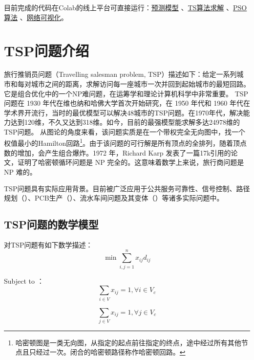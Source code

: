 \documentclass[lang=cn,11pt]{elegantpaper}
\begin{document}
目前完成的代码在Colab的线上平台可直接运行：\href{https://colab.research.google.com/drive/1RbuBFjDMMJOdUdolHUidi7XJHm31H9LO?usp=sharing}{预测模型} 、\href{TSPhttps://drive.google.com/file/d/1WkCjeRRS7c865NCn8-WB9OvwsBAs_f8J/view?usp=sharing}{TS算法求解} 
、\href{https://colab.research.google.com/drive/12uEouDs0WgpGLXXJuKCdpZBuNEWTzwnU?usp=sharing}{PSO算法}
、\href{https://colab.research.google.com/drive/1rSY5I-OB6pMvfSTHOYcodqXi0ivuDbGx?usp=sharing}{网络可视化}。

\section{TSP问题介绍}
旅行推销员问题（Travelling salesman problem, TSP）描述如下：给定一系列城市和每对城市之间的距离，求解访问每一座城市一次并回到起始城市的最短回路。
它是组合优化中的一个NP难问题，在运筹学和理论计算机科学中非常重要。
TSP问题在 1930 年代在维也纳和哈佛大学首次开始研究，在 1950 年代和 1960 年代在学术界开流行，当时的最优模型可以解决48城市的TSP问题。在1970年代，解决能力达到120维，不久又达到318维。如今，目前的最强模型能求解多达24978维的TSP问题。
从图论的角度来看，该问题实质是在一个带权完全无向图中，找一个权值最小的Hamilton回路\footnote{哈密顿图是一类无向图，从指定的起点前往指定的终点，途中经过所有其他节点且只经过一次。闭合的哈密顿路径称作哈密顿回路。}。由于该问题的可行解是所有顶点的全排列，随着顶点数的增加，会产生组合爆炸。1972 年，Richard Karp 发表了一篇17k引用的论文\cite{nphard}，证明了哈密顿循环问题是 NP 完全的。这意味着数学上来说，旅行商问题是 NP 难的。


TSP问题具有实际应用背景。目前被广泛应用于公共服务可靠性、信号控制、路径规划（\cite{tspintranspot}）、PCB生产（\cite{tspbookPCB}）、流水车间问题及其变体（\cite{bagchi2006review}）等诸多实际问题中。

\subsection{TSP问题的数学模型}
对TSP问题有如下数学描述：
\begin{equation}
    \min \sum_{i,j=1}^{n} x_{ij} d_{ij} 
    \label{eq:tsp description}
\end{equation}

Subject to ：
\begin{equation}
    \sum_{i\in V} x_{i j}=1 , \forall i \in V_{c}
    \label{eq:binom}
\end{equation}

\begin{equation}
    \sum_{j\in V} x_{i j}=1 , \forall j \in V_{c}
    \label{eq:binom}
\end{equation}
\end{document}
